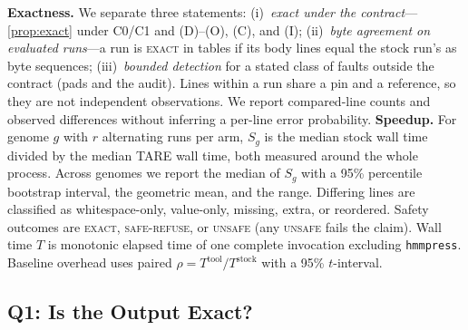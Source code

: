 \documentclass[letterpaper,twocolumn,10pt]{article}
\theoremstyle{definition}
\newcommand{\sys}{TARE\xspace}
\newcommand{\sys}{PARE\xspace}
\newcommand{\dec}[1]{\textsc{#1}}
\begin{document}
\textbf{Exactness.} We separate three statements: (i)~\emph{exact under the contract}---\cref{prop:exact} under C0/C1 and
(D)--(O), (C), and (I); (ii)~\emph{byte agreement on evaluated runs}---a run is \dec{exact} in tables if its body lines equal the stock
run's as byte sequences; (iii)~\emph{bounded detection} for a stated class of faults outside the contract (pads and the
audit). Lines within a run share a pin and a reference, so they are not independent observations.
We report compared-line counts and observed differences without inferring a per\nobreakdash-line error probability.
\textbf{Speedup.} For genome $g$ with $r$ alternating runs per arm, $S_g$ is the median stock wall time divided by the
median \sys wall time, both measured around the whole process. Across genomes we report the median of $S_g$ with a 95\%
percentile bootstrap interval, the geometric mean, and the range. Differing lines are classified as whitespace\nobreakdash-only,
value\nobreakdash-only, missing, extra, or reordered. Safety outcomes are \dec{exact}, \dec{safe-refuse}, or \dec{unsafe}
(any \dec{unsafe} fails the claim). Wall time $T$ is monotonic elapsed time of one complete invocation excluding
\texttt{hmmpress}. Baseline overhead uses paired $\rho = T^{\text{tool}}/T^{\text{stock}}$ with a 95\% $t$-interval.

\subsection{Q1: Is the Output Exact?}
\label{sec:eval-exact}
\end{document}
